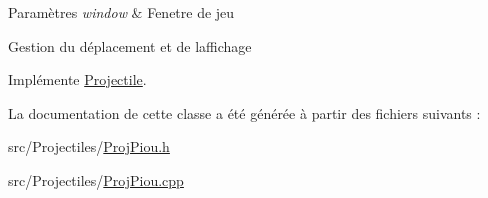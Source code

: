 \begin{DoxyParams}{Paramètres}
{\em window} & Fenetre de jeu\\
\hline
\end{DoxyParams}
Gestion du déplacement et de l\textquotesingle{}affichage 

Implémente \hyperlink{class_projectile_aa969857f9837d9be3a6ea415c9ba3ff1}{Projectile}.



La documentation de cette classe a été générée à partir des fichiers suivants \+:\begin{DoxyCompactItemize}
\item 
src/\+Projectiles/\hyperlink{_proj_piou_8h}{Proj\+Piou.\+h}\item 
src/\+Projectiles/\hyperlink{_proj_piou_8cpp}{Proj\+Piou.\+cpp}\end{DoxyCompactItemize}
